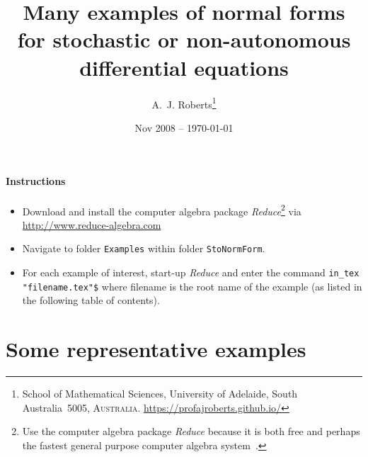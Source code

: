 \documentclass[11pt,a4paper]{refart}
\title{Many examples of normal forms for stochastic or non-autonomous differential equations}
\author{A.~J. Roberts\thanks{School of Mathematical Sciences, University of Adelaide, South Australia~5005, \textsc{Australia}.
\url{https://profajroberts.github.io/}}}
\date{Nov 2008 -- \today}
\begin{document}
\maketitle


\paragraph{Instructions}
\begin{itemize}
\item Download and install the computer algebra package
\emph{Reduce}\footnote{Use the computer algebra package \emph{Reduce} 
because it is both free 
and perhaps the fastest general purpose computer algebra 
system~\cite[e.g.]{Fateman2002}.} via \url{http://www.reduce-algebra.com}



\item Navigate to folder \verb|Examples| within folder \verb|StoNormForm|.

\item For each example of interest, start-up \emph{Reduce} and enter the command \verb|in_tex "filename.tex"$|  where filename is the root name of the example (as listed in the following table of contents).

\end{itemize}


\tableofcontents




\section{Some representative examples}











\end{document}
